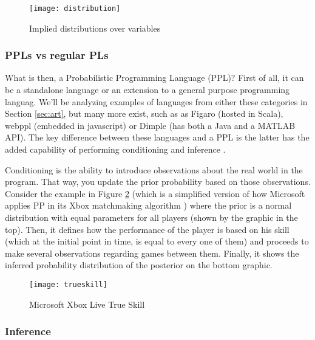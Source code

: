 \begin{itemsize}
\begin{figure}[t]
  \begin{center}
    \leavevmode
    \texttt{[image: distribution]}
    \caption{Implied distributions over variables \cite{intpp}}
    \label{fig:distribution}
  \end{center}
\end{figure}

\subsubsection{PPLs vs regular PLs}

What is then, a Probabilistic Programming Language (PPL)? First of all, it can
be a standalone language or an extension to a general purpose programming languag.
We'll be analyzing examples of languages from either these categories in Section
\ref{sec:art}, but many more exist, such as as Figaro \cite{figaro} (hosted in Scala),
webppl \cite{dippl} (embedded in javascript) or Dimple
\cite{DBLP:journals/corr/abs-1212-2991} (has both a Java and a MATLAB API).
The key difference between these languages and a PPL is the latter has
the added capability of performing conditioning and inference \cite{Andrieu2003}.

Conditioning is the ability to introduce observations about the real world in
the program. That way, you update the prior probability based
on those observations. Consider the example in Figure \ref{fig:truskill} (which
is a simplified version of how Microsoft applies PP in its Xbox matchmaking
algorithm \cite{minka2012infer}) where the prior is a normal distribution with
equal parameters for all players (shown by the graphic in the top). Then, it
defines how the performance of the player is based on his skill (which at the initial
point in time, is equal to every one of them) and proceeds to make several
observations regarding games between them. Finally, it shows the inferred
probability distribution of the posterior on the bottom graphic.

\begin{figure}[t]
  \begin{center}
    \leavevmode
    \texttt{[image: trueskill]}
    \caption{Microsoft Xbox Live True Skill \cite{minka2012infer}}
    \label{fig:truskill}
  \end{center}
\end{figure}

\subsubsection{Inference}


\end{itemsize}
